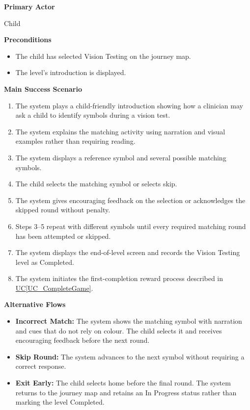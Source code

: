 \documentclass[10pt]{article}
\newcommand{\ucref}[1]{\hyperref[#1]{UC\ref*{#1}}}
\begin{document}
\textbf{Primary Actor}

Child

\textbf{Preconditions}
\begin{itemize}
    \item The child has selected Vision Testing on the journey map.
    \item The level's introduction is displayed.
\end{itemize}

\textbf{Main Success Scenario}
\begin{enumerate}
    \item The system plays a child-friendly introduction showing
    how a clinician may ask a child to identify symbols during
    a vision test.
    \item The system explains the matching activity using narration
    and visual examples rather than requiring reading.
    \item The system displays a reference symbol and several
    possible matching symbols.
    \item The child selects the matching symbol or selects skip.
    \item The system gives encouraging feedback on the selection
    or acknowledges the skipped round without penalty.
    \item Steps 3--5 repeat with different symbols until every
    required matching round has been attempted or skipped.
    \item The system displays the end-of-level screen and records
    the Vision Testing level as Completed.
    \item The system initiates the first-completion reward process
    described in \ucref{UC_CompleteGame}.
\end{enumerate}

\textbf{Alternative Flows}
\begin{itemize}
    \item \textbf{Incorrect Match:} The system shows the matching
    symbol with narration and cues that do not rely on colour. The
    child selects it and receives encouraging feedback before the
    next round.
    \item \textbf{Skip Round:} The system advances to the next symbol
    without requiring a correct response.
    \item \textbf{Exit Early:} The child selects home before the final
    round. The system returns to the journey map and retains an
    In Progress status rather than marking the level Completed.
\end{itemize}
\end{document}
